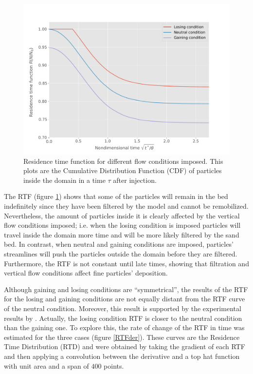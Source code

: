 \documentclass[draft,linenumbers]{agujournal2018}
\begin{document}
\begin{figure}[ht]
\centering
\includegraphics[trim=0.2cm 0.2cm 0.2cm 0.2cm, width=35pc]
{190131_RTF.pdf}
\caption{Residence time function for different flow conditions imposed. This plots are the Cumulative Distribution Function (CDF) of particles inside the domain in a time $\tau$ after injection.}
\label{RTF}
\end{figure}

The RTF (figure \ref{RTF}) shows that some of the particles will remain in the bed indefinitely since they have been filtered by the model and cannot be remobilized. Nevertheless, the amount of particles inside it is clearly affected by the vertical flow conditions imposed; i.e. when the losing condition is imposed particles will travel inside the domain more time and will be more likely filtered by the sand bed. In contrast, when neutral and gaining conditions are imposed, particles' streamlines will push the particles outside the domain before they are filtered. Furthermore, the RTF is not constant until late times, showing that filtration and vertical flow conditions affect fine particles' deposition.   

Although gaining and losing conditions are ``symmetrical'', the results of the RTF for the losing and gaining conditions are not equally distant from the RTF curve of the neutral condition. Moreover, this result is supported by the experimental results by \citet{Fox2018}. Actually, the losing condition RTF is closer to the neutral condition than the gaining one. To explore this, the rate of change of the RTF in time was estimated for the three cases (figure \ref{RTFder}). These curves are the Residence Time Distribution (RTD) and were obtained by taking the gradient of each RTF and then applying a convolution between the derivative and a top hat function with unit area and a span of $400$ points. 
\end{document}

